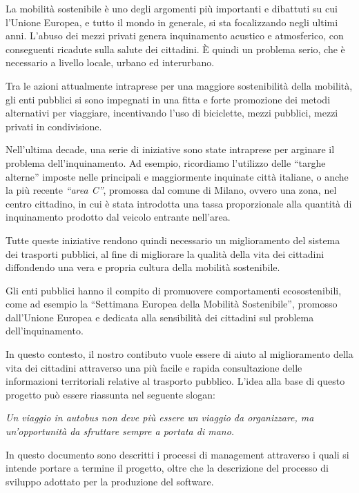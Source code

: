La mobilit\`{a} sostenibile \`{e} uno degli argomenti pi\`{u} importanti e dibattuti su cui l\rq Unione Europea, e tutto il mondo in generale, si sta focalizzando negli ultimi anni. L\rq abuso dei mezzi privati genera inquinamento acustico e atmosferico, con conseguenti ricadute sulla salute dei cittadini. \`{E} quindi un problema serio, che \`{e} necessario a livello locale, urbano ed interurbano. 

Tra le azioni attualmente intraprese per una maggiore sostenibilit\`{a} della mobilit\`{a}, gli enti pubblici si sono impegnati in una fitta e forte promozione dei metodi alternativi per viaggiare, incentivando l\rq uso di biciclette, mezzi pubblici, mezzi privati in condivisione. 

Nell\rq ultima decade, una serie di iniziative sono state intraprese per arginare il problema dell\rq inquinamento. Ad esempio, ricordiamo l\rq utilizzo delle ``targhe alterne'' imposte nelle principali e maggiormente inquinate citt\`{a} italiane, o anche la pi\`{u} recente \emph{``area C''}, promossa dal comune di Milano, ovvero una zona, nel centro cittadino, in cui \`{e} stata introdotta una tassa proporzionale alla quantit\`{a} di inquinamento prodotto dal veicolo entrante nell\rq area.

Tutte queste iniziative rendono quindi necessario un miglioramento del sistema dei trasporti pubblici, al fine di migliorare la qualit\`{a} della vita dei cittadini diffondendo una vera e propria cultura della mobilit\`{a} sostenibile.

Gli enti pubblici hanno il compito di promuovere comportamenti ecosostenibili, come ad esempio la ``Settimana Europea della Mobilit\`{a} Sostenibile'', promosso dall\rq Unione Europea e dedicata alla sensibilit\`{a} dei cittadini sul problema dell\rq inquinamento.

In questo contesto, il nostro contibuto vuole essere di aiuto al miglioramento della vita dei cittadini attraverso una pi\`{u} facile e rapida consultazione delle informazioni territoriali relative al trasporto pubblico. L\rq idea alla base di questo progetto pu\`{o} essere riassunta nel seguente slogan:

\begin{center}
\emph{Un viaggio in autobus non deve pi\`{u} essere un viaggio da organizzare, ma un\rq opportunit\`{a} da sfruttare sempre a portata di mano.}
\end{center}

In questo documento sono descritti i processi di management attraverso i quali si intende portare a termine il progetto, oltre che la descrizione del processo di sviluppo adottato per la produzione del software. 

